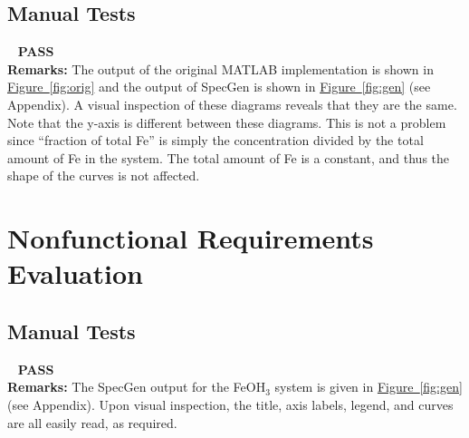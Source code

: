 \documentclass[12pt, titlepage]{article}
\newcommand{\progname}{SpecGen}
\newcounter{testnum} %
\begin{document}
\subsection{Manual Tests}
~
{\color{Green} \bf PASS}\\[\baselineskip]
{\bf Remarks:} The output of the original MATLAB implementation is shown
in \hyperref[fig:orig]{Figure~\ref*{fig:orig}} and the output of \progname{}
is shown in \hyperref[fig:gen]{Figure~\ref*{fig:gen}} (see Appendix).  A visual
inspection of these diagrams reveals that they are the same.  Note that the y-axis
is different between these diagrams.  This is not a problem since ``fraction of
total Fe'' is simply the concentration divided by the total amount of Fe in the system.
The total amount of Fe is a constant, and thus the shape of the curves is not affected.

\section{Nonfunctional Requirements Evaluation}
\subsection{Manual Tests}
~{\color{Green} \bf PASS}\\[\baselineskip]
{\bf Remarks:}  The \progname{} output for the FeOH$_3$ system is given in 
\hyperref[fig:gen]{Figure~\ref*{fig:gen}} (see Appendix).  Upon visual inspection,
the title, axis labels, legend, and curves are all easily read, as required.
\end{document}
